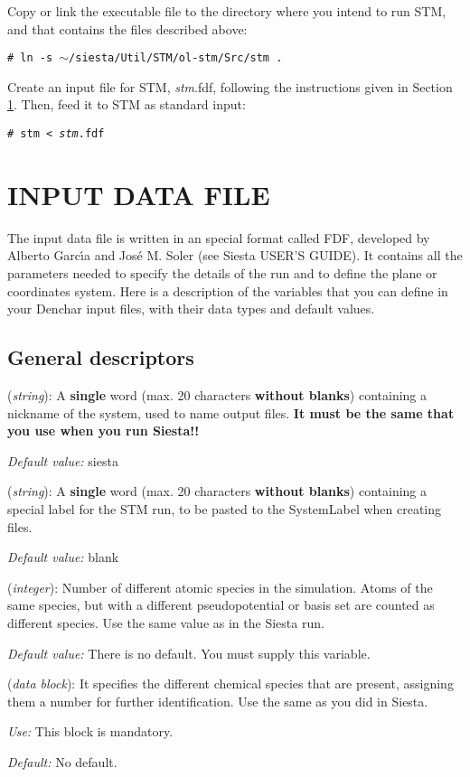  Copy or link the executable file to the directory
 where you intend to run  {\sc STM}, and that
 contains the files described above:

 {\tt \# ln -s $\sim$/siesta/Util/STM/ol-stm/Src/stm . }

 Create an input file for {\sc STM}, {\it stm}.fdf, following the 
 instructions given in Section \ref{cap:input}. Then,
 feed it to  {\sc STM} as standard input:

 {\tt \# stm < {\it stm}.fdf } 

\section{INPUT DATA FILE}
\label{cap:input} 

The input data file is written in an special format called FDF, developed
by Alberto Garc\'{\i}a and Jos\'e M. Soler (see {\sc Siesta} USER'S GUIDE).
It contains all the parameters needed to specify the details
of the run and to define the plane or coordinates system.
Here is a description of the variables that you can define in your 
{\sc Denchar} input files,
with their data types and default values.

\vspace{5pt}
\subsection{General descriptors}

\begin{description}
\itemsep 10pt
\parsep 0pt

\item[{\bf SystemLabel}] ({\it string}): 
A {\bf single} word (max. 20 characters {\bf without blanks})
containing a nickname of the system, used to name output files. 
{\bf It must be the same that you use when you run {\sc Siesta}!!}

{\it Default value:} siesta

\item[{\bf STM.label}] ({\it string}): 
A {\bf single} word (max. 20 characters {\bf without blanks})
containing a special label for the STM run, to be pasted to the
SystemLabel when creating files.

{\it Default value:} blank

\item[{\bf NumberOfSpecies}] ({\it integer}):
Number of different atomic species in the simulation.
Atoms of the same species, but with a different
pseudopotential or basis set are counted as different species.
Use the same value as in the {\sc Siesta} run.

{\it Default value:} There is no default. You must supply this variable.


\item[{\bf ChemicalSpeciesLabel}] ({\it data block}):
It specifies the different chemical species that are present,
assigning them a number for further identification.
Use the same as you did in {\sc Siesta}.

{\it Use:} This block is mandatory.

{\it Default:} No default.
\end{description}


